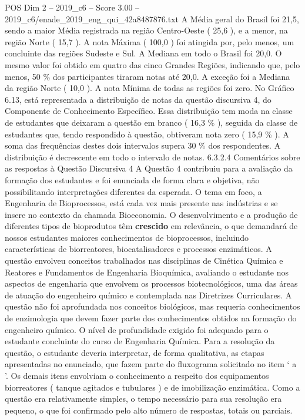 \begin{textsample}{POS Dim 2 – 2019\_c6 – Score 3.00 – 2019\_c6/enade\_2019\_eng\_qui\_42a8487876.txt}
A Média geral do Brasil foi 21,5, sendo a maior Média registrada na região Centro-Oeste ( 25,6 ), e a menor, na região Norte ( 15,7 ).
A nota Máxima ( 100,0 ) foi atingida por, pelo menos, um concluinte das regiões Sudeste e Sul.
A Mediana em todo o Brasil foi 20,0.
O mesmo valor foi obtido em quatro das cinco Grandes Regiões, indicando que, pelo menos, 50 \% dos participantes tiraram notas até 20,0.
A exceção foi a Mediana da região Norte ( 10,0 ).
A nota Mínima de todas as regiões foi zero.
No Gráfico 6.13, está representada a distribuição de notas da questão discursiva 4, do Componente de Conhecimento Específico.
Essa distribuição tem moda na classe de estudantes que deixaram a questão em branco ( 16,3 \% ), seguida da classe de estudantes que, tendo respondido à questão, obtiveram nota zero ( 15,9 \% ).
A soma das frequências destes dois intervalos supera 30 \% dos respondentes.
A distribuição é decrescente em todo o intervalo de notas. 6.3.2.4 Comentários sobre as respostas à Questão Discursiva 4 A Questão 4 contribuiu para a avaliação da formação dos estudantes e foi enunciada de forma clara e objetiva, não possibilitando interpretações diferentes da esperada.
O tema em foco, a Engenharia de Bioprocessos, está cada vez mais presente nas indústrias e se insere no contexto da chamada Bioeconomia.
O desenvolvimento e a produção de diferentes tipos de bioprodutos têm \textbf{crescido} em relevância, o que demandará de nossos estudantes maiores conhecimentos de bioprocessos, incluindo características de biorreatores, biocatalisadores e processos enzimáticos.
A questão envolveu conceitos trabalhados nas disciplinas de Cinética Química e Reatores e Fundamentos de Engenharia Bioquímica, avaliando o estudante nos aspectos de engenharia que envolvem os processos biotecnológicos, uma das áreas de atuação do engenheiro químico e contemplada nas Diretrizes Curriculares.
A questão não foi aprofundada nos conceitos biológicos, mas requeria conhecimentos de enzimologia que devem fazer parte dos conhecimentos obtidos na formação do engenheiro químico.
O nível de profundidade exigido foi adequado para o estudante concluinte do curso de Engenharia Química.
Para a resolução da questão, o estudante deveria interpretar, de forma qualitativa, as etapas apresentadas no enunciado, que fazem parte do fluxograma solicitado no item ‘ a ’.
Os demais itens envolviam o conhecimento a respeito dos equipamentos biorreatores ( tanque agitados e tubulares ) e de imobilização enzimática.
Como a questão era relativamente simples, o tempo necessário para sua resolução era pequeno, o que foi confirmado pelo alto número de respostas, totais ou parciais.

\end{textsample}
